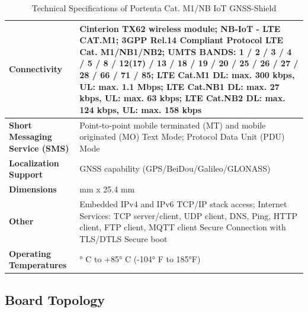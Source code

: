 \begin{table}[ht]
	\centering
	\begin{tabular}{|>{\raggedright\arraybackslash}m{4cm}|>{\raggedright\arraybackslash}m{10cm}|}
		\hline
		\textbf{Connectivity} & Cinterion TX62 wireless module; NB-IoT - LTE CAT.M1; 3GPP Rel.14 Compliant Protocol LTE Cat. M1/NB1/NB2; UMTS BANDS: 1 / 2 / 3 / 4 / 5 / 8 / 12(17) / 13 / 18 / 19 / 20 / 25 / 26 / 27 / 28 / 66 / 71 / 85; LTE Cat.M1 DL: max. 300 kbps, UL: max. 1.1 Mbps; LTE Cat.NB1 DL: max. 27 kbps, UL: max. 63 kbps; LTE Cat.NB2 DL: max. 124 kbps, UL: max. 158 kbps \\
		\hline
		\textbf{Short Messaging Service (SMS)} & Point-to-point mobile terminated (MT) and mobile originated (MO) Text Mode; Protocol Data Unit (PDU) Mode \\
		\hline
		\textbf{Localization Support} & GNSS capability (GPS/BeiDou/Galileo/GLONASS) \\
		\hline
		\textbf{Dimensions} & 66 mm x 25.4 mm \\
		\hline
		\textbf{Other} & Embedded IPv4 and IPv6 TCP/IP stack access; Internet Services: TCP server/client, UDP client, DNS, Ping, HTTP client, FTP client, MQTT client Secure Connection with TLS/DTLS Secure boot \\
		\hline
		\textbf{Operating Temperatures} & -40° C to +85° C (-104° F to 185°F) \\
		\hline
	\end{tabular}
	\caption{Technical Specifications of Portenta Cat. M1/NB IoT GNSS-Shield}
	\label{tab:TechSpec}
	\cite{ArduinoPortenta:2024}
\end{table}

\subsection{Board Topology}

